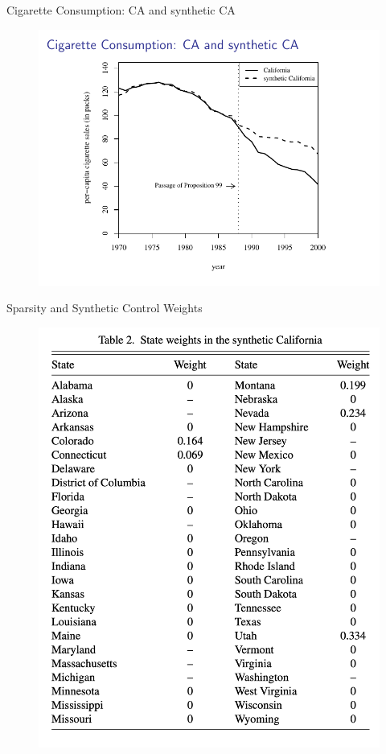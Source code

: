 \documentclass{beamer}
\begin{document}
\begin{frame}{Cigarette Consumption: CA and synthetic CA}
	
	\begin{figure}
	\includegraphics[scale=0.75]{./lecture_includes/abadie_4.pdf}
	\end{figure}
\end{frame}

\begin{frame}{Sparsity and Synthetic Control Weights}
	\begin{figure}
	\includegraphics[scale=0.25]{./lecture_includes/synth_smoking_table2.png}
	\end{figure}
\end{frame}
\end{document}
